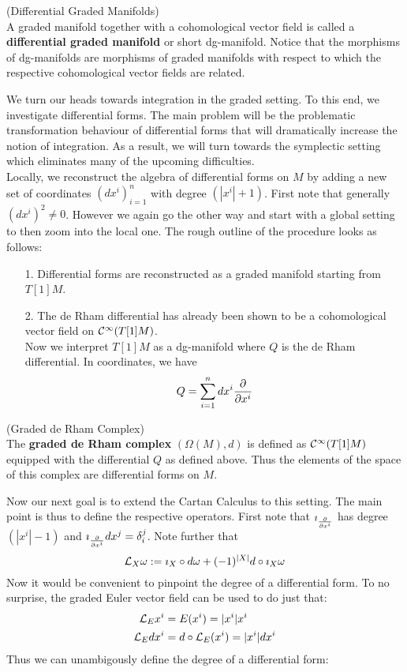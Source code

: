 
\begin{definition} (Differential Graded Manifolds)\\
  A graded manifold together with a cohomological vector field is called a \textbf{differential graded manifold} or short dg-manifold. Notice that the morphisms of dg-manifolds are morphisms of graded manifolds with respect to which the respective cohomological vector fields are related.
\end{definition}

We turn our heads towards integration in the graded setting. To this end, we investigate differential forms. The main problem will be the problematic transformation behaviour of differential forms that will dramatically increase the notion of integration. As a result, we will turn towards the symplectic setting which eliminates many of the upcoming difficulties.\\

Locally, we reconstruct the algebra of differential forms on $M$ by adding a new set of coordinates $(dx^i)^n_{i=1}$ with degree $(|x^i|+1)$. First note that generally $(dx^i)^2 \neq 0$. However we again go the other way and start with a global setting to then zoom into the local one. The rough outline of the procedure looks as follows:

\begin{itemize}
  \item[1.] Differential forms are reconstructed as a graded manifold starting from $T[1]M$.
  \item[2.] The de Rham differential has already been shown to be a cohomological vector field on $\mathcal{C}^{\infty}(T[1]M)$.\\
  Now we interpret $T[1]M$ as a dg-manifold where $Q$ is the de Rham differential. In coordinates, we have
  $$ Q = \sum_{i=1}^n dx^i \frac{\partial }{\partial x^i} $$
\end{itemize}

\begin{definition} (Graded de Rham Complex)\\
  The \textbf{graded de Rham complex} $(\Omega(M), d)$ is defined as $\mathcal{C}^{\infty}(T[1]M)$ equipped with the differential $Q$ as defined above. Thus the elements of the space of this complex are differential forms on $M$.
\end{definition}

Now our next goal is to extend the Cartan Calculus to this setting. The main point is thus to define the respective operators. First note that $ \imath_{\frac{\partial }{\partial x^i}} $ has degree $(|x^i|-1)$ and $ \imath_{\frac{\partial }{\partial x^i}} dx^j = \delta^j_i $. Note further that
$$ \mathcal{L}_{X}\omega := \imath_X \circ d\omega + (-1)^{|X|} d \circ \imath_X \omega $$
Now it would be convenient to pinpoint the degree of a differential form. To no surprise, the graded Euler vector field can be used to do just that:
\begin{align*}
  \mathcal{L}_{E} x^i &= E(x^i) = |x^i| x^i\\
  \mathcal{L}_{E} dx^i &= d \circ \mathcal{L}_{E}(x^i) = |x^i| dx^i
\end{align*}
Thus we can unambigously define the degree of a differential form:

